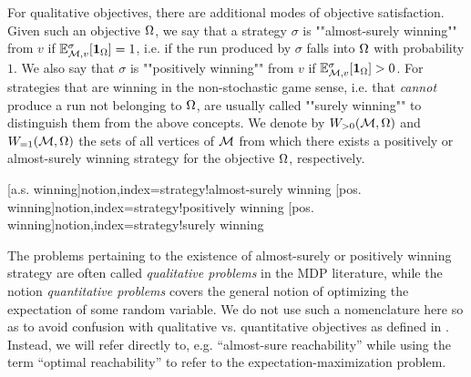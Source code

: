 For qualitative objectives, there are additional modes of objective satisfaction. Given such an objective $\Omega$, we say that a strategy $\sigma$ is ""almost-surely winning"" from $v$ if $\mathbb{E}^{\sigma}_{\mathcal{M},v}[\mathbf{1}_{\Omega}]=1$, i.e. if the run produced by $\sigma$ falls into $\Omega$ with probability $1$. We also say that $\sigma$ is ""positively winning"" from $ v $ if $\mathbb{E}^{\sigma}_{\mathcal{M},v}[\mathbf{1}_{\Omega}]>0$. For strategies that are winning in the non-stochastic game sense, i.e. that \emph{cannot} produce a run not belonging to $\Omega$, are usually called ""surely winning"" to distinguish them from the above concepts. We denote by $W_{>0}(\mathcal{M},\Omega)$ and $W_{=1}(\mathcal{M},\Omega)$ the sets of all vertices of $\mathcal{M}$ from which there exists a positively or almost-surely winning strategy for the objective $\Omega$, respectively.

[a.s. winning]{notion,index={strategy!almost-surely winning}}
[pos. winning]{notion,index={strategy!positively winning}}
[pos. winning]{notion,index={strategy!surely winning}}


The problems pertaining to the existence of almost-surely or positively winning strategy are often called \emph{qualitative problems} in the MDP literature, while the notion \emph{quantitative problems} covers the general notion of optimizing the expectation of some random variable. We do not use such a nomenclature here so as to avoid confusion with qualitative vs. quantitative objectives as defined in . Instead, we will refer directly to, e.g. ``almost-sure reachability'' while using the term ``optimal reachability'' to refer to the expectation-maximization problem.

%


